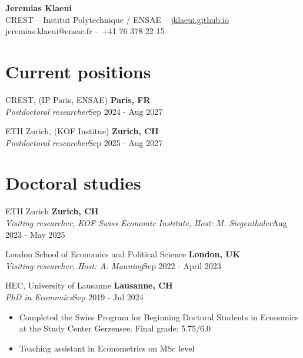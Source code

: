 \documentclass[letter, 11pt]{res}
\begin{document}
\begin{center}
\textbf{{Jeremias Klaeui}}\\
CREST -- Institut Polytechnique / ENSAE --  \href{https://jklaeui.github.io/}{jklaeui.github.io}\\
jeremias.klaeui@ensae.fr -- +41 76 378 22 15\\
\end{center}
\begin{resume}
 \vspace{-8mm}


\section{Current positions}
\vspace{1mm}

CREST, (IP Paris, ENSAE) \hfill \textbf{Paris, FR} \\
\textit{Postdoctoral researcher}\hfill Sep 2024 - Aug 2027


ETH Zurich, (KOF Institue) \hfill \textbf{Zurich, CH} \\
\textit{Postdoctoral researcher}\hfill Sep 2025 - Aug 2027

\section{Doctoral studies}
\vspace{1mm}

ETH Zurich \hfill \textbf{Zurich, CH} \\
\textit{Visiting researcher, KOF Swiss Economic Institute, Host: M. Siegenthaler}\hfill Aug 2023 - May 2025


London School of Economics and Political Science \hfill \textbf{London, UK} \\
\textit{Visiting researcher, Host: A. Manning}\hfill Sep 2022 - April 2023


HEC, University of Lausanne \hfill \textbf{Lausanne, CH} \\
\textit{PhD in Economics}\hfill Sep 2019 - Jul 2024
\begin{itemize}[topsep=0pt]
	\item[--] Completed the Swiss Program for Beginning Doctoral Students in Economics at the Study Center Gerzensee. Final grade: 5.75/6.0
	\item[--] Teaching assistant in Econometrics on MSc level
\end{itemize}


\end{resume}
\end{document}
